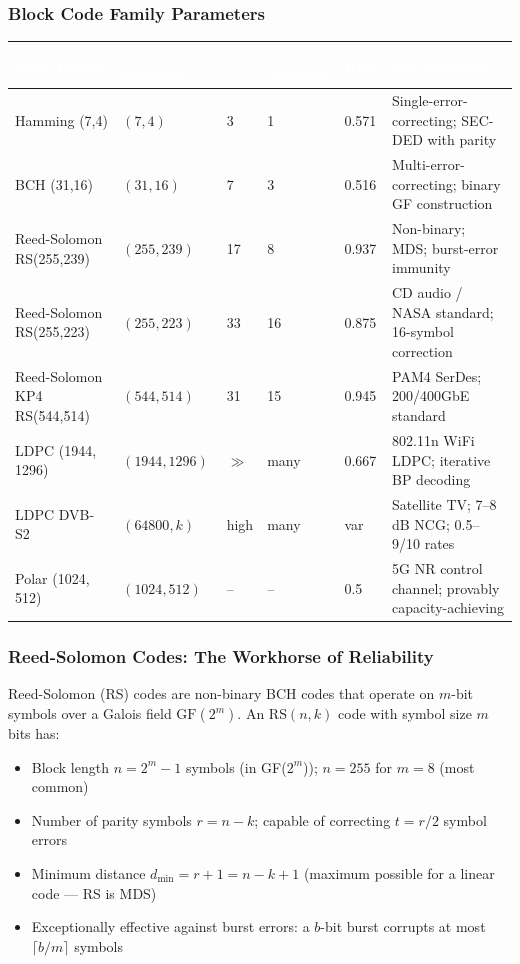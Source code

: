 \documentclass[11pt,letterpaper]{article}
\newcommand{\tableheader}[1]{\textbf{\sffamily\textcolor{white}{#1}}}
\begin{document}
\subsubsection{Block Code Family Parameters}

\begin{center}
\begin{tabularx}{\textwidth}{L{3cm}C{2cm}C{1.8cm}C{1.8cm}C{1.5cm}X}
\toprule
{}
\tableheader{Code Family} & \tableheader{$(n, k)$ Example} & \tableheader{$d_{\min}$} & \tableheader{$t$ (correct)} & \tableheader{Rate} & \tableheader{Key Property} \\
\midrule
Hamming (7,4) & $(7, 4)$ & 3 & 1 & 0.571 & Single-error-correcting; SEC-DED with parity \\
BCH (31,16) & $(31, 16)$ & 7 & 3 & 0.516 & Multi-error-correcting; binary GF construction \\
Reed-Solomon RS(255,239) & $(255, 239)$ & 17 & 8 & 0.937 & Non-binary; MDS; burst-error immunity \\
Reed-Solomon RS(255,223) & $(255, 223)$ & 33 & 16 & 0.875 & CD audio / NASA standard; 16-symbol correction \\
Reed-Solomon KP4 RS(544,514) & $(544, 514)$ & 31 & 15 & 0.945 & PAM4 SerDes; 200/400GbE standard \\
LDPC (1944, 1296) & $(1944, 1296)$ & $\gg$ & many & 0.667 & 802.11n WiFi LDPC; iterative BP decoding \\
LDPC DVB-S2 & $(64800, k)$ & high & many & var & Satellite TV; 7--8 dB NCG; 0.5--9/10 rates \\
Polar (1024, 512) & $(1024, 512)$ & -- & -- & 0.5 & 5G NR control channel; provably capacity-achieving \\
\bottomrule
\end{tabularx}
\end{center}

\subsubsection{Reed-Solomon Codes: The Workhorse of Reliability}

Reed-Solomon (RS) codes are non-binary BCH codes that operate on $m$-bit symbols over a Galois field $\text{GF}(2^m)$. An RS$(n,k)$ code with symbol size $m$ bits has:
\begin{itemize}[leftmargin=*]
  \item Block length $n = 2^m - 1$ symbols (in GF($2^m$)); $n = 255$ for $m=8$ (most common)
  \item Number of parity symbols $r = n - k$; capable of correcting $t = r/2$ symbol errors
  \item Minimum distance $d_{\min} = r + 1 = n - k + 1$ (maximum possible for a linear code --- RS is MDS)
  \item Exceptionally effective against burst errors: a $b$-bit burst corrupts at most $\lceil b/m \rceil$ symbols
\end{itemize}
\end{document}

